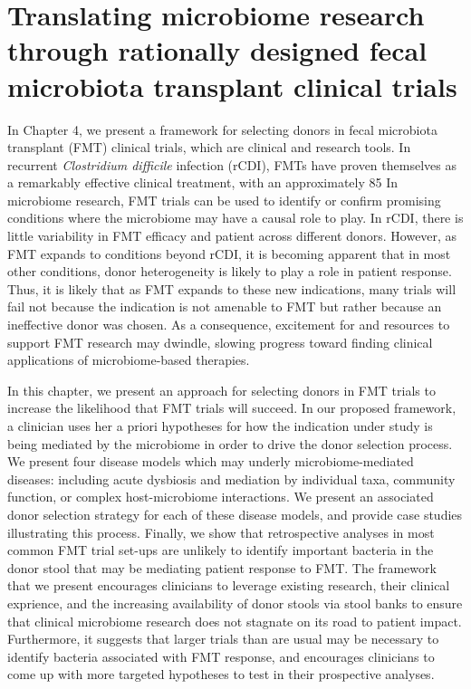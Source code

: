 \section{Translating microbiome research through rationally designed fecal microbiota transplant clinical trials}

In Chapter 4, we present a framework for selecting donors in fecal microbiota transplant (FMT) clinical trials, which are clinical and research tools.
In recurrent \textit{Clostridium difficile} infection (rCDI), FMTs have proven themselves as a remarkably effective clinical treatment, with an approximately 85%
In microbiome research, FMT trials can be used to identify or confirm promising conditions where the microbiome may have a causal role to play.
In rCDI, there is little variability in FMT efficacy and patient across different donors.
However, as FMT expands to conditions beyond rCDI, it is becoming apparent that in most other conditions, donor heterogeneity is likely to play a role in patient response.
Thus, it is likely that as FMT expands to these new indications, many trials will fail not because the indication is not amenable to FMT but rather because an ineffective donor was chosen.
As a consequence, excitement for and resources to support FMT research may dwindle, slowing progress toward finding clinical applications of microbiome-based therapies.

In this chapter, we present an approach for selecting donors in FMT trials to increase the likelihood that FMT trials will succeed.
In our proposed framework, a clinician uses her a priori hypotheses for how the indication under study is being mediated by the microbiome in order to drive the donor selection process.
We present four disease models which may underly microbiome-mediated diseases: including acute dysbiosis and mediation by individual taxa, community function, or complex host-microbiome interactions.
We present an associated donor selection strategy for each of these disease models, and provide case studies illustrating this process.
Finally, we show that retrospective analyses in most common FMT trial set-ups are unlikely to identify important bacteria in the donor stool that may be mediating patient response to FMT.
The framework that we present encourages clinicians to leverage existing research, their clinical exprience, and the increasing availability of donor stools via stool banks to ensure that clinical microbiome research does not stagnate on its road to patient impact.
Furthermore, it suggests that larger trials than are usual may be necessary to identify bacteria associated with FMT response, and encourages clinicians to come up with more targeted hypotheses to test in their prospective analyses.


